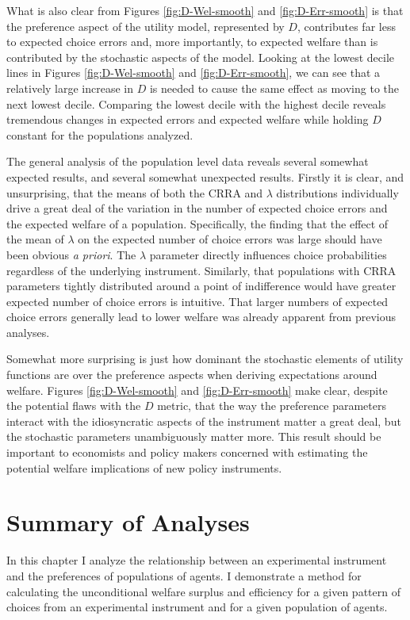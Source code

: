 \documentclass[../main.tex]{subfiles}
\begin{document}
What is also clear from Figures \ref{fig:D-Wel-smooth} and \ref{fig:D-Err-smooth} is that the preference aspect of the utility model, represented by $D$, contributes far less to expected choice errors and, more importantly, to expected welfare than is contributed by the stochastic aspects of the model.
Looking at the lowest decile lines in Figures \ref{fig:D-Wel-smooth} and \ref{fig:D-Err-smooth}, we can see that a relatively large increase in $D$ is needed to cause the same effect as moving to the next lowest decile.
Comparing the lowest decile with the highest decile reveals tremendous changes in expected errors and expected welfare while holding $D$ constant for the populations analyzed.

The general analysis of the population level data reveals several somewhat expected results, and several somewhat unexpected results.
Firstly it is clear, and unsurprising, that the means of both the CRRA and $\lambda$ distributions individually drive a great deal of the variation in the number of expected choice errors and the expected welfare of a population.
Specifically, the finding that the effect of the mean of $\lambda$ on the expected number of choice errors was large should have been obvious \textit{a priori}.
The $\lambda$ parameter directly influences choice probabilities regardless of the underlying instrument.
Similarly, that populations with CRRA parameters tightly distributed around a point of indifference would have greater expected number of choice errors is intuitive.
That larger numbers of expected choice errors generally lead to lower welfare was already apparent from previous analyses.

Somewhat more surprising is just how dominant the stochastic elements of utility functions are over the preference aspects when deriving expectations around welfare.
Figures \ref{fig:D-Wel-smooth} and \ref{fig:D-Err-smooth} make clear, despite the potential flaws with the $D$ metric, that the way the preference parameters interact with the idiosyncratic aspects of the instrument matter a great deal, but the stochastic parameters unambiguously matter more.
This result should be important to economists and policy makers concerned with estimating the potential welfare implications of new policy instruments.

\section{Summary of Analyses}

In this chapter I analyze the relationship between an experimental instrument and the preferences of populations of agents.
I demonstrate a method for calculating the unconditional welfare surplus and efficiency for a given pattern of choices from an experimental instrument and for a given population of agents.
\end{document}
